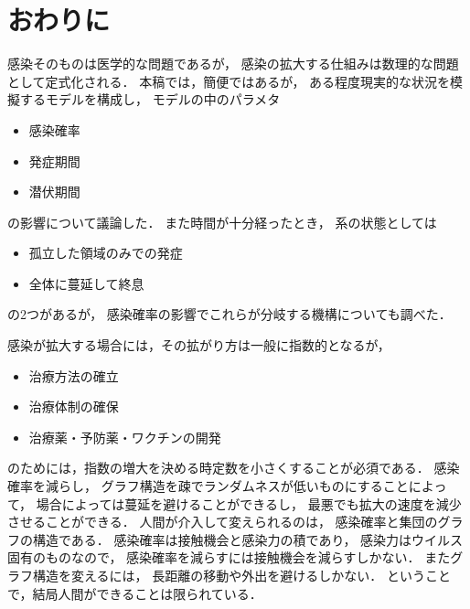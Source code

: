 \documentclass[10pt,oneside]{scrartcl}
\begin{document}
\section{おわりに}
\label{sec:orgc3504bd}

感染そのものは医学的な問題であるが，
感染の拡大する仕組みは数理的な問題として定式化される．
本稿では，簡便ではあるが，
ある程度現実的な状況を模擬するモデルを構成し，
モデルの中のパラメタ
\begin{itemize}
\item 感染確率
\item 発症期間
\item 潜伏期間
\end{itemize}
の影響について議論した．
また時間が十分経ったとき，
系の状態としては
\begin{itemize}
\item 孤立した領域のみでの発症
\item 全体に蔓延して終息
\end{itemize}
の2つがあるが，
感染確率の影響でこれらが分岐する機構についても調べた．

感染が拡大する場合には，その拡がり方は一般に指数的となるが，
\begin{itemize}
\item 治療方法の確立
\item 治療体制の確保
\item 治療薬・予防薬・ワクチンの開発
\end{itemize}
のためには，指数の増大を決める時定数を小さくすることが必須である．
感染確率を減らし，
グラフ構造を疎でランダムネスが低いものにすることによって，
場合によっては蔓延を避けることができるし，
最悪でも拡大の速度を減少させることができる．
人間が介入して変えられるのは，
感染確率と集団のグラフの構造である．
感染確率は接触機会と感染力の積であり，
感染力はウイルス固有のものなので，
感染確率を減らすには接触機会を減らすしかない．
またグラフ構造を変えるには，
長距離の移動や外出を避けるしかない．
ということで，結局人間ができることは限られている．
\end{document}
